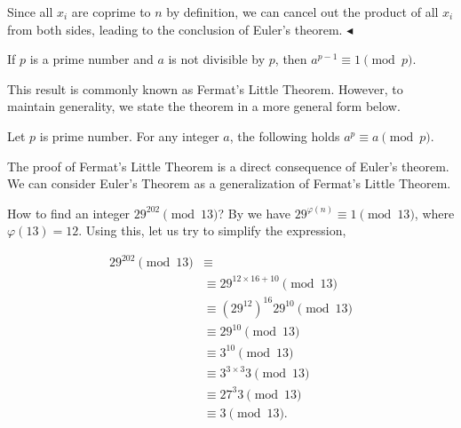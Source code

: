 \documentclass[../lecture-notes-148x210.tex]{subfiles}
\begin{document}
Since all $x_i$ are coprime to $n$ by definition, we can cancel out the product
of all $x_i$ from both sides, leading to the conclusion of Euler's theorem.
$\blacktriangleleft$

\begin{corollary} \label{cor:fermat_little_theorem}
    If $p$ is a prime number and $a$ is not divisible by $p$, then $a^{p - 1} \equiv 1 \pmod{p}$.
\end{corollary}
This result is commonly known as Fermat's Little Theorem. However, to maintain generality, 
we state the theorem in a more general form below.

\begin{theorem}  \label{th:fermat_little_theorem}
    Let $p$ is prime number. For any integer $a$, the following holds $a^{p} \equiv a \pmod{p}$.
\end{theorem}

The proof of Fermat's Little Theorem is a direct consequence of Euler's theorem.
We can consider Euler's Theorem as a generalization of Fermat's Little Theorem.

\begin{example}
    How to find an integer $29^{202} \pmod{13}$?
    By  we have $29^{\varphi(n)} \equiv 1 \pmod{13}$, where $\varphi(13) = 12$. 
    Using this, let us try to simplify the expression, 
 
    \begin{equation*}
        \begin{aligned}
            29^{202} \pmod{13}  &\equiv \\
                                &\equiv 29^{12 \times 16 + 10} \pmod{13} \\
                                &\equiv (29^{12})^{16} 29^{10} \pmod{13} \\
                                &\equiv 29^{10} \pmod{13} \\
                                &\equiv 3^{10} \pmod{13} \\
                                &\equiv 3^{3 \times 3} 3 \pmod{13} \\
                                &\equiv 27^{3}3 \pmod{13} \\
                                &\equiv 3 \pmod{13}.
        \end{aligned}
    \end{equation*}
\end{example}
\end{document}
